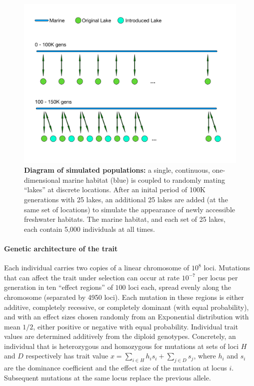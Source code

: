 \documentclass{article}
\begin{document}
\begin{figure}
	\begin{center}
  		\includegraphics[width=0.6\linewidth]{GeographyFigure.pdf}
  		\caption{
            \textbf{Diagram of simulated populations:}
            a single, continuous, one-dimensional marine habitat (blue)
            is coupled to randomly mating ``lakes'' at discrete locations.
            After an inital period of 100K generations with 25 lakes,
            an additional 25 lakes are added (at the same set of locations)
            to simulate the appearance of newly accessible freshwater habitats.
            The marine habitat, and each set of 25 lakes, each contain 5,000 individuals at all times.
			}
  		\label{fig:Geo}
	\end{center}
\end{figure}


\paragraph{Genetic architecture of the trait}
Each individual carries two copies of a linear chromosome of $10^8$ loci.
Mutations that can affect the trait under selection can occur at rate $10^{-7}$ per locus per generation
in ten ``effect regions'' of $100$ loci each,
spread evenly along the chromosome (separated by 4950 loci).
Each mutation in these regions is either additive, completely recessive, or completely dominant (with equal probability), 
and with an effect sizes chosen randomly from an Exponential distribution with mean $1/2$, either positive or negative with equal probability. 
Individual trait values are determined additively from the diploid genotypes. 
Concretely, an individual that is heterozygous and homozygous for mutations at sets of loci $H$ and $D$ respectively has trait value 
$x = \sum_{i \in H} h_i s_i + \sum_{j \in D} s_j$, 
where $h_i$ and $s_i$ are the dominance coefficient and the effect size of the mutation at locus $i$.
Subsequent mutations at the same locus replace the previous allele.
\end{document}
